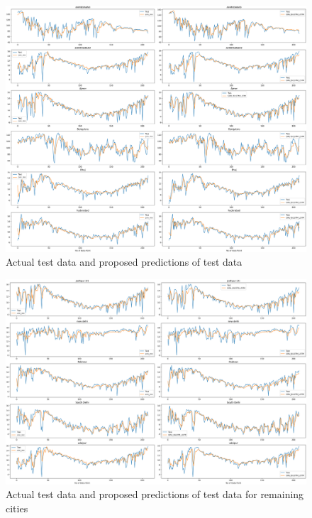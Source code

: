 \documentclass[a4paper,fleqn]{cas-sc}
\begin{document}
\begin{figure}[!ht]
\centering
\includegraphics[width=\textwidth]{1act vs pred}
\caption{Actual test data and proposed predictions of test data}
\label{Line plot11}
\end{figure}

\begin{figure}[!ht]
\centering
\includegraphics[width=\textwidth]{2act vs pred}
\caption{Actual test data and proposed predictions of test data for remaining cities}
\label{Line plot11}
\end{figure}
\end{document}
